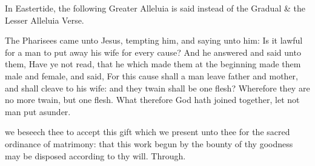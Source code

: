 
\begin{rubric}
    In Eastertide, the following Greater Alleluia is said instead of the Gradual \& the Lesser Alleluia Verse.
\end{rubric}


 The Pharisees came unto Jesus, tempting him, and saying unto him: Is it lawful for a man to put away his wife for every cause? And he answered and said unto them, Have ye not read, that he which made them at the beginning made them male and female, and said, For this cause shall a man leave father and mother, and shall cleave to his wife: and they twain shall be one flesh? Wherefore they are no more twain, but one flesh. What therefore God hath joined together, let not man put asunder.


\secret
{} we beseech thee to accept this gift which we present unto thee for the sacred ordinance of matrimony: that this work begun by the bounty of thy goodness may be disposed according to thy will. Through.

